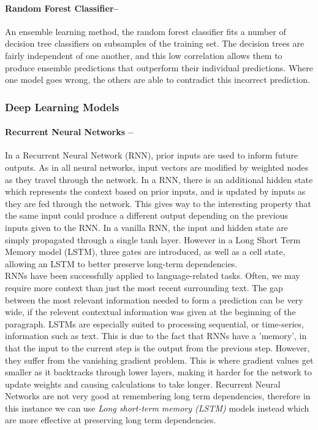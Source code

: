\documentclass[12pt,a4paper]{article}
\begin{document}
\paragraph{Random Forest Classifier--}
An ensemble learning method, the random forest classifier fits a number of decision tree classifiers on subsamples of the training set. The decision trees are fairly independent of one another, and this low correlation allows them to produce ensemble predictions that outperform their individual predictions. Where one model goes wrong, the others are able to contradict this incorrect prediction.

\subsubsection{Deep Learning Models}
\paragraph{Recurrent Neural Networks --}
In a Recurrent Neural Network (RNN), prior inputs are used to inform future outputs. As in all neural networks, input vectors are modified by weighted nodes as they travel through the network. In a RNN, there is an additional hidden state which represents the context based on prior inputs, and is updated by inputs as they are fed through the network. This gives way to the interesting property that the same input could produce a different output depending on the previous inputs given to the RNN. In a vanilla RNN, the input and hidden state are simply propagated through a single tanh layer. However in a Long Short Term Memory model (LSTM), three gates are introduced, as well as a cell state, allowing an LSTM to better preserve long-term dependencies.\\

RNNs have been successfully applied to language-related tasks. Often, we may require more context than just the most recent surrounding text. The gap between the most relevant information needed to form a prediction can be very wide, if the relevent contextual information was given at the beginning of the paragraph. LSTMs are especially suited to processing sequential, or time-series, information such as text. This is due to the fact that RNNs have a 'memory', in that the input to the current step is the output from the previous step. However, they suffer from the vanishing gradient problem. This is where gradient values get smaller as it backtracks through lower layers, making it harder for the network to update weights and causing calculations to take longer. Recurrent Neural Networks are not very good at remembering long term dependencies, therefore in this instance we can use \textit{Long short-term memory (LSTM)} models \cite{hochreiter1997long} instead which are more effective at preserving long term dependencies.
\end{document}
